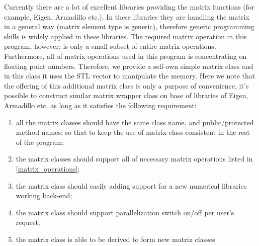 Currently there are a lot of excellent libraries providing the matrix
functions (for example, Eigen, Armadillo etc.). In these libraries
they are handling the matrix in a general way (matrix element type is
generic), therefore generic programming skills is widely applied in these
libraries. The required matrix operation in this program, however; is only
a small subset of entire matrix operations. Furthermore, all of matrix
operations used in this program is concentrating on floating point numbers.
Therefore, we provide a self-own simple matrix class and in this class
it uses the STL vector to manipulate the memory. Here we note that the 
offering of this additional matrix class is only a purpose of convenience,
it's possible to construct similar matrix wrapper class on base of 
libraries of Eigen, Armadillo etc. as long as it satisfies the following 
requirement:
\begin{enumerate}
 \item all the matrix classes should have the same class name, and 
 public/protected method names; so that to keep the use of 
 matrix class consistent in the rest of the program;
 \item the matrix classes should support all of necessary matrix operations
 listed in \ref{matrix_operations};
 \item the matrix class should easily adding support for a new numerical 
 libraries working back-end; 
 \item the matrix class should support parallelization switch on/off per 
 user's request;
 \item the matrix class is able to be derived to form new matrix classes 
\end{enumerate}

